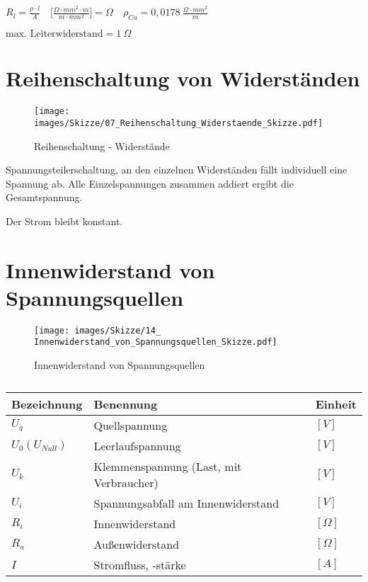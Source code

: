 $\boxed{R_l = \frac{\rho \cdot l}{A}} \quad \bigl[\frac{\Omega \cdot mm^2 \cdot m}{m \cdot mm^2}\bigl] = \Omega \quad \rho_{Cu} = 0,0178~\frac{\Omega \cdot mm^2}{m}$

$\boxed{\text{max. Leiterwiderstand} = 1~\Omega}$

\newpage

\section{Reihenschaltung von
Widerständen}\label{reihenschaltung-von-widerstaenden}

\begin{figure}[!ht]%
\centering
\texttt{[image: images/Skizze/07\_Reihenschaltung\_Widerstaende\_Skizze.pdf]}
\caption{Reihenschaltung - Widerstände}
\end{figure}

Spannungsteilerschaltung, an den einzelnen Widerständen fällt
individuell eine Spannung ab. Alle Einzelspannungen zusammen addiert
ergibt die Gesamtspannung.

Der Strom bleibt konstant.

\newpage

\section{Innenwiderstand von
Spannungsquellen}\label{innenwiderstand-von-spannungsquellen}

\begin{figure}[!ht]%
\centering
\texttt{[image: images/Skizze/14\_ Innenwiderstand\_von\_Spannungsquellen\_Skizze.pdf]}
\caption{Innenwiderstand von Spannungsquellen}
\end{figure}

\begin{table}[!ht]%
\centering 
	\caption{}%
\begin{tabular}{@{}lll@{}}
\hline
\textbf{Bezeichnung} & \textbf{Benennung} & \textbf{Einheit} \\
\hline
$U_q$ & Quellspannung & $[V]$ \\
$U_0 (U_{Null})$ & Leerlaufspannung & $[V]$ \\
$U_k$ & Klemmenspannung (Last, mit Verbraucher) & $[V]$ \\
$U_i$ & Spannungsabfall am Innenwiderstand & $[V]$ \\
$R_i$ & Innenwiderstand & $[\Omega]$ \\
$R_a$ & Außenwiderstand & $[\Omega]$ \\
$I$ & Stromfluss, -stärke & $[A]$ \\
\hline
\end{tabular} 
\end{table}

